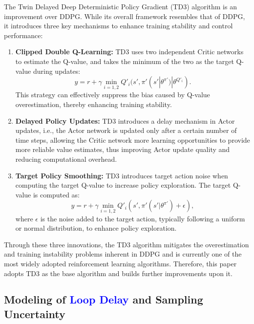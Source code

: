 \documentclass[review]{elsarticle}
\begin{document}
The Twin Delayed Deep Deterministic Policy Gradient (TD3) algorithm is an improvement over DDPG. While its overall framework resembles that of DDPG, it introduces three key mechanisms to enhance training stability and control performance:

\begin{enumerate}
\item \textbf{Clipped Double Q-Learning:} TD3 uses two independent Critic networks to estimate the Q-value, and takes the minimum of the two as the target Q-value during updates:
\begin{equation}\label{eq:clipped_double_q}
y = r + \gamma \min_{i=1,2} Q'_i(s', \pi'(s'|\theta^{\pi'})|\theta^{Q'_i}).
\end{equation}
This strategy can effectively suppress the bias caused by Q-value overestimation, thereby enhancing training stability.

\item \textbf{Delayed Policy Updates:} TD3 introduces a delay mechanism in Actor updates, i.e., the Actor network is updated only after a certain number of time steps, allowing the Critic network more learning opportunities to provide more reliable value estimates, thus improving Actor update quality and reducing computational overhead.

\item \textbf{Target Policy Smoothing:} TD3 introduces target action noise when computing the target Q-value to increase policy exploration. The target Q-value is computed as:
\begin{equation}\label{eq:target_smoothing}
y = r + \gamma \min_{i=1,2} Q'_i(s', \pi'(s'|\theta^{\pi'}) + \epsilon),
\end{equation}
where $\epsilon$ is the noise added to the target action, typically following a uniform or normal distribution, to enhance policy exploration.
\end{enumerate}

Through these three innovations, the TD3 algorithm mitigates the overestimation and training instability problems inherent in DDPG and is currently one of the most widely adopted reinforcement learning algorithms. Therefore, this paper adopts TD3 as the base algorithm and builds further improvements upon it.

\subsection{Modeling of \textcolor{blue}{Loop Delay} and Sampling Uncertainty}
\end{document}
